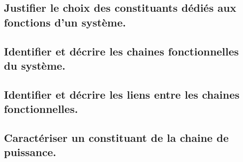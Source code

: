 \documentclass[10pt,fleqn]{article}
\newcommand{\repRel}{../..}
\newcommand{\repStyle}{\repRel/Style}
\newcommand{\td}{fichier_td}
\newcommand{\repExos}{\repRel/ExercicesCompetences}
\newcommand{\repExo}{dossier}
\begin{document}
\begin{multicols}{2} 

\renewcommand{\repExo}{\repExos/A3_AnalyseFonctionnelleStructurelle/A3_01_ChaineFonctionnelle/58_Oz440}
\renewcommand{\td}{58_Oz440}
\graphicspath{{\repStyle/png/}{\repExo/images/}}


\renewcommand{\repExo}{\repExos/A3_AnalyseFonctionnelleStructurelle/A3_01_ChaineFonctionnelle/59_Levage}
\renewcommand{\td}{59_Levage}
\graphicspath{{\repStyle/png/}{\repExo/images/}}


\renewcommand{\repExo}{\repExos/A3_AnalyseFonctionnelleStructurelle/A3_01_ChaineFonctionnelle/60_Escalier}
\renewcommand{\td}{60_Escalier}
\graphicspath{{\repStyle/png/}{\repExo/images/}}


\end{multicols}

\subsection{Justifier le choix des constituants dédiés aux fonctions d’un système.} 

\begin{multicols}{2} 

\end{multicols}

\subsection{Identifier et décrire les chaines fonctionnelles du système.} 

\begin{multicols}{2} 

\end{multicols}

\subsection{Identifier et décrire les liens entre les chaines fonctionnelles.} 

\begin{multicols}{2} 

\end{multicols}

\subsection{Caractériser un constituant de la chaine de puissance.} 
\end{document}
